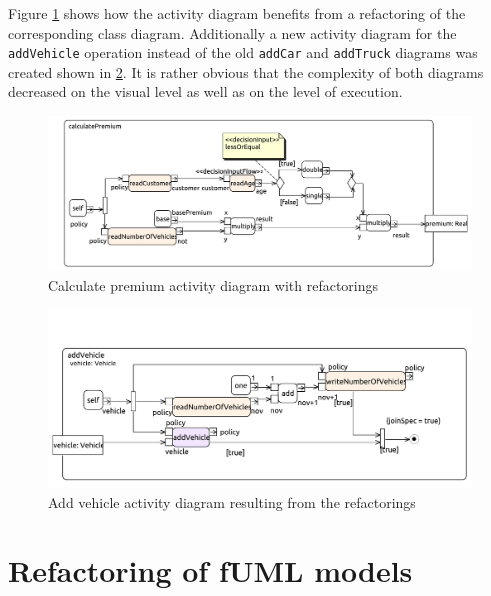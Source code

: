 \documentclass{llncs}
\begin{document}
Figure \ref{fig:calculatePremiumRef} shows how the activity diagram benefits from a refactoring of the corresponding 
class diagram. Additionally a new activity diagram for the \lstinline|addVehicle| operation instead of the old 
\lstinline|addCar| and \lstinline|addTruck| diagrams was created shown in \ref{fig:addCarRef}. It is rather obvious 
that the complexity of both diagrams decreased on the visual level as well as on the level of execution.

\begin{figure}[h!t]
 \centering
 \includegraphics[scale=0.5]{images/insurance_ref/Activity_calculatePremium_calculatePremium}
 \caption{Calculate premium activity diagram with refactorings}
 \label{fig:calculatePremiumRef}
\end{figure}

\begin{figure}[h!t]
 \centering
 \includegraphics[scale=0.6]{images/insurance_ref/Activity_addVehicle_addVehicle}
 \caption{Add vehicle activity diagram resulting from the refactorings}
 \label{fig:addCarRef}
\end{figure}

\section{Refactoring of fUML models}
\label{sec:fuml-refactoring}
\end{document}
